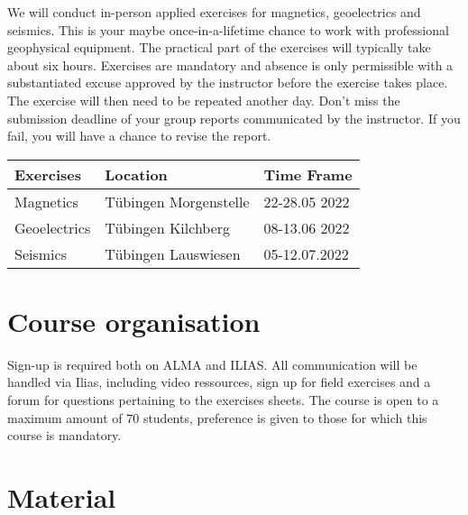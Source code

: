 \documentclass[letterpaper]{inzane_syllabus} %
\begin{document}
We will conduct in-person applied exercises for magnetics, geoelectrics and seismics. This is your maybe once-in-a-lifetime chance to work with professional geophysical equipment. The practical part of the exercises will typically take about six hours. Exercises are mandatory and absence is only permissible with a substantiated excuse approved by the instructor before the exercise takes place. The exercise will then need to be repeated another day. Don't miss the submission deadline of your group reports communicated by the instructor. If you fail, you will have a chance to revise the report.
\begin{center}
\begin{tabular}{ p{3cm}p{5cm} p{3cm}}
 \textbf{Exercises} & Location  & Time Frame \\
 \hline
 Magnetics   & Tübingen Morgenstelle & 22-28.05 2022       \\
 Geoelectrics &  Tübingen Kilchberg & 08-13.06 2022  \\
 Seismics & Tübingen Lauswiesen & 05-12.07.2022 \\
\end{tabular}
\end{center}

\section{Course organisation}

Sign-up is required both on ALMA and ILIAS. All communication will be handled via Ilias, including video ressources, sign up for field exercises and a forum for questions pertaining to the exercises sheets. The course is open to a maximum amount of 70 students, preference is given to those for which this course is mandatory.


\newpage %

\makeSide %


\section{Material}
\end{document}
